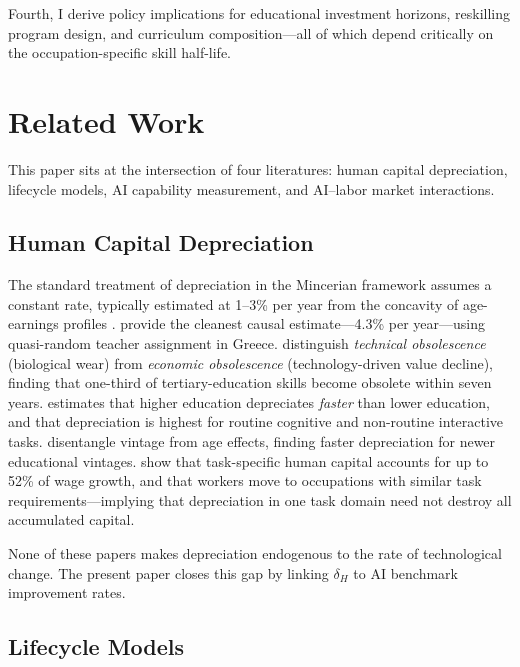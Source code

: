 \documentclass[11pt,a4paper]{article}
\theoremstyle{definition}
\begin{document}
Fourth, I derive policy implications for educational investment horizons, reskilling program design, and curriculum composition---all of which depend critically on the occupation-specific skill half-life.


\section{Related Work}
\label{sec:related}

This paper sits at the intersection of four literatures: human capital depreciation, lifecycle models, AI capability measurement, and AI--labor market interactions.

\subsection{Human Capital Depreciation}

The standard treatment of depreciation in the Mincerian framework assumes a constant rate, typically estimated at 1--3\% per year from the concavity of age-earnings profiles \citep{mincer1974schooling, heckman2006earnings}. \citet{dinerstein2022depreciation} provide the cleanest causal estimate---4.3\% per year---using quasi-random teacher assignment in Greece. \citet{degrip2002obsolescence} distinguish \textit{technical obsolescence} (biological wear) from \textit{economic obsolescence} (technology-driven value decline), finding that one-third of tertiary-education skills become obsolete within seven years. \citet{weber2014depreciation} estimates that higher education depreciates \textit{faster} than lower education, and that depreciation is highest for routine cognitive and non-routine interactive tasks. \citet{neuman1995vintage} disentangle vintage from age effects, finding faster depreciation for newer educational vintages. \citet{gathmann2010general} show that task-specific human capital accounts for up to 52\% of wage growth, and that workers move to occupations with similar task requirements---implying that depreciation in one task domain need not destroy all accumulated capital.

None of these papers makes depreciation endogenous to the rate of technological change. The present paper closes this gap by linking $\delta_H$ to AI benchmark improvement rates.

\subsection{Lifecycle Models}
\end{document}
